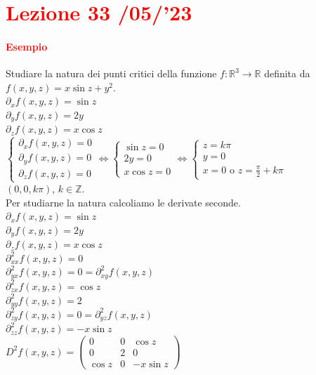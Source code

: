 \documentclass{article}
\newcommand{\R}{\mathbb{R}}
\newcommand{\Z}{\mathbb{Z}}
\begin{document}
\newpage
\section{\textcolor{red}{Lezione 33 \space{}/05/'23}}

\paragraph{\textcolor{red}{Esempio}}
Studiare la natura dei punti critici della funzione $f: \R^3 \rightarrow \R$ definita da $f(x,y,z)=x\sin z + y^2$.\\
$\partial_x f(x,y,z)=\sin z$\\
$\partial_y f(x,y,z)=2y$\\
$\partial_z f(x,y,z)=x \cos z$\\
$\begin{cases}
    \partial_x f(x,y,z)=0\\
    \partial_y f(x,y,z)=0\\
    \partial_z f(x,y,z)=0
\end{cases}\Leftrightarrow\begin{cases}
    \sin z=0\\
    2y=0\\
    x\cos z=0
\end{cases}\Leftrightarrow\begin{cases}
    z=k\pi\\
    y=0\\
    x=0 \text{  o  } z=\frac{\pi}{2}+k\pi
\end{cases}$\\
$(0,0,k\pi)$, $k \in \Z$.\\
Per studiarne la natura calcoliamo le derivate seconde.\\
$\partial_x f(x,y,z)=\sin z$\\
$\partial_y f(x,y,z)=2y$\\
$\partial_z f(x,y,z)=x \cos z$\\
$\partial_{xx}^2f(x,y,z)=0$\\
$\partial_{yx}^2f(x,y,z)=0=\partial_{xy}^2f(x,y,z)$\\
$\partial_{zx}^2f(x,y,z)=\cos z$\\
$\partial_{yy}^2f(x,y,z)=2$\\
$\partial_{zy}^2f(x,y,z)=0=\partial_{yz}^2f(x,y,z)$\\
$\partial_{zz}^2f(x,y,z)=-x \sin z$\\
$D^2f(x,y,z)=\begin{pmatrix}
    0&0&\cos z\\
    0&2&0\\
    \cos z&0&-x \sin z
\end{pmatrix}$\\
\end{document}
